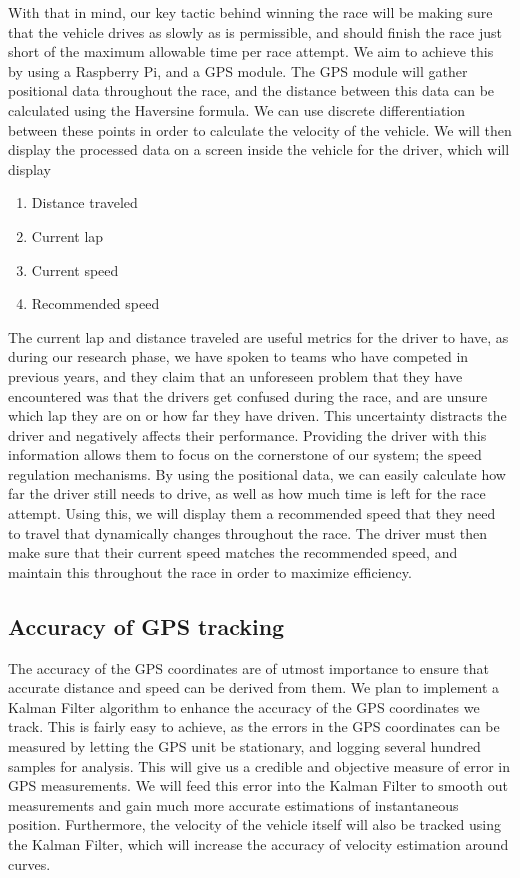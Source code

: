 \documentclass[a4paper, 12pt]{article}
\begin{document}
			With that in mind, our key tactic behind winning the race will be making sure that the vehicle drives as slowly as is permissible, and should finish the race just short of the maximum allowable time per race attempt. We aim to achieve this by using a Raspberry Pi, and a GPS module. The GPS module will gather positional data throughout the race, and the distance between this data can be calculated using the Haversine formula. We can use discrete differentiation between these points in order to calculate the velocity of the vehicle. We will then display the processed data on a screen inside the vehicle for the driver, which will display
			\begin{enumerate}
				\item Distance traveled
				\item Current lap
				\item Current speed
				\item Recommended speed
			\end{enumerate}

			The current lap and distance traveled are useful metrics for the driver to have, as during our research phase, we have spoken to teams who have competed in previous years, and they claim that an unforeseen problem that they have encountered was that the drivers get confused during the race, and are unsure which lap they are on or how far they have driven. This uncertainty distracts the driver and negatively affects their performance. Providing the driver with this information allows them to focus on the cornerstone of our system; the speed regulation mechanisms. By using the positional data, we can easily calculate how far the driver still needs to drive, as well as how much time is left for the race attempt. Using this, we will display them a recommended speed that they need to travel that dynamically changes throughout the race. The driver must then make sure that their current speed matches the recommended speed, and maintain this throughout the race in order to maximize efficiency.

		\subsection{Accuracy of GPS tracking} %
		\label{sub:accuracy_of_gps_tracking}
			The accuracy of the GPS coordinates are of utmost importance to ensure that accurate distance and speed can be derived from them. We plan to implement a Kalman Filter algorithm to enhance the accuracy of the GPS coordinates we track. This is fairly easy to achieve, as the errors in the GPS coordinates can be measured by letting the GPS unit be stationary, and logging several hundred samples for analysis. This will give us a credible and objective measure of error in GPS measurements. We will feed this error into the Kalman Filter to smooth out measurements and gain much more accurate estimations of instantaneous position. Furthermore, the velocity of the vehicle itself will also be tracked using the Kalman Filter, which will increase the accuracy of velocity estimation around curves.
\end{document}
